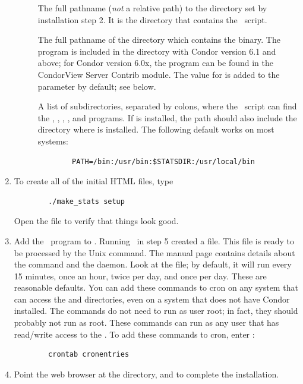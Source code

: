 \begin{enumerate}
\begin{description}
	\item[] The full pathname
	(\emph{not} a relative path) to the  directory set
	by installation step 2.  
	It is the directory that contains the \MakeStats\ script.

	\item[]  The full pathname of the
	directory which contains the  binary.
	The  program is included in the 
	directory with Condor version 6.1 and above; for Condor version
	6.0x, the  program can be found in the CondorView
	Server Contrib module.
	The value for  is added to the 
	parameter by default; see below.  

	\item[] A list of subdirectories,
	separated by colons, where the \MakeStats\ script can find
	the , , , , and 
	programs.  
	If  is installed, the path should also
	include the directory where  is installed.
	The following default works on most systems:
        \begin{verbatim} 
        PATH=/bin:/usr/bin:$STATSDIR:/usr/local/bin
        \end{verbatim}

        \end{description}

\item To create all of the initial HTML files, type
\begin{verbatim}
        ./make_stats setup  
\end{verbatim}
Open the file  to verify that things look good.


\item Add the \MakeStats\ program to .  
Running \MakeStats\ in step 5 created a  file.
This  file is ready to be processed by the Unix
 command.
The  manual page contains details about
the  command and the  daemon.
Look at the
 file; by default, it will run 
 every 15 minutes, 
 once an hour, 
 twice per day, and 
 once per day.
These are reasonable defaults.  
You can add these commands to cron on any
system that can access the  and
 directories,
even on a system that does not have Condor installed.
The commands do not need to run as user root; in
fact, they should probably not run as root.  These commands can run
as any user that has read/write access to the .
To add these
commands to cron, enter : 
\begin{verbatim} 
        crontab cronentries
\end{verbatim}

\item Point the web browser at the  directory,
and to complete the installation.

\end{enumerate}

